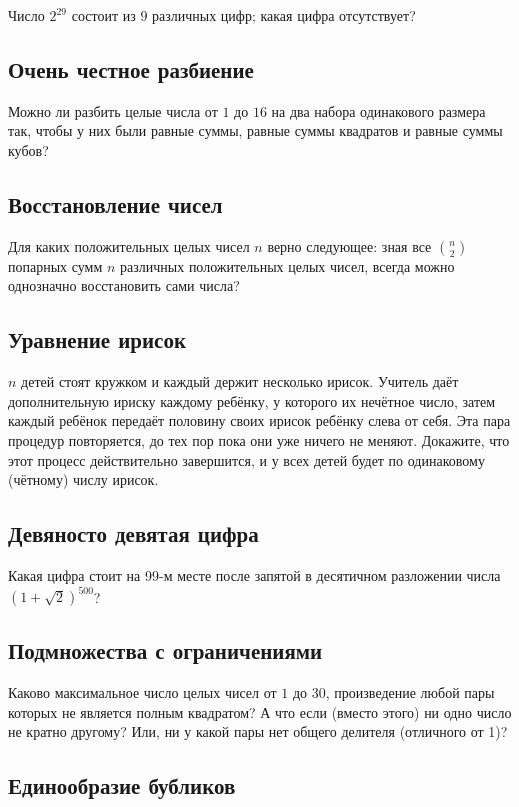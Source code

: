 Число $2^{29}$ состоит из $9$ различных цифр; какая цифра отсутствует?

\subsection*{Очень честное разбиение}

Можно ли разбить целые числа от $1$ до $16$ на два набора одинакового размера так,
чтобы у них были равные суммы, равные суммы квадратов и равные суммы кубов?

\subsection*{Восстановление чисел}
Для каких положительных целых чисел $n$ верно следующее: зная все $\binom n2$ попарных сумм $n$ различных положительных целых чисел, всегда можно однозначно восстановить сами числа?


\subsection*{Уравнение ирисок}

$n$ детей стоят кружком и каждый держит несколько ирисок.
Учитель даёт дополнительную ириску каждому ребёнку, у которого их нечётное число,
затем каждый ребёнок передаёт половину своих ирисок ребёнку слева от себя.
Эта пара процедур повторяется, до тех пор пока они уже ничего не меняют.
Докажите, что этот процесс действительно завершится, и у всех детей будет по одинаковому (чётному) числу ирисок.

\subsection*{Девяносто девятая цифра}

Какая цифра стоит на 99-м месте после запятой в десятичном разложении числа 
$(1+\sqrt2)^{500}$?

\subsection*{Подмножества с ограничениями}

Каково максимальное число целых чисел от $1$ до $30$, произведение любой пары которых не является полным квадратом?
А что если (вместо этого) ни одно число не кратно другому?
Или, ни у какой пары нет общего делителя (отличного от 1)?

\subsection*{Единообразие бубликов}\label{Единообразие бубликов}

